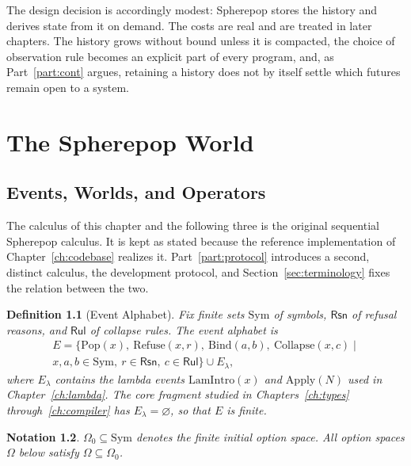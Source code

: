 \documentclass[12pt,oneside,openany]{book}
\theoremstyle{spherepop}
\newtheorem{definition}{Definition}[chapter]
\theoremstyle{remarkstyle}
\newtheorem{notation}[definition]{Notation}
\newcommand{\Pop}{\mathrm{Pop}}
\newcommand{\Rfuse}{\mathrm{Refuse}}
\newcommand{\Bind}{\mathrm{Bind}}
\newcommand{\Col}{\mathrm{Collapse}}
\newcommand{\Sym}{\mathrm{Sym}}
\begin{document}
The design decision is accordingly modest: Spherepop stores the history and derives state from it on demand. The costs are real and are treated in later chapters. The history grows without bound unless it is compacted, the choice of observation rule becomes an explicit part of every program, and, as Part~\ref{part:cont} argues, retaining a history does not by itself settle which futures remain open to a system.

\chapter{The Spherepop World}
\label{ch:world}

\section{Events, Worlds, and Operators}

The calculus of this chapter and the following three is the original sequential Spherepop calculus. It is kept as stated because the reference implementation of Chapter~\ref{ch:codebase} realizes it. Part~\ref{part:protocol} introduces a second, distinct calculus, the development protocol, and Section~\ref{sec:terminology} fixes the relation between the two.

\begin{definition}[Event Alphabet]
Fix finite sets $\Sym$ of symbols, $\mathsf{Rsn}$ of refusal reasons, and $\mathsf{Rul}$ of collapse rules. The \emph{event alphabet} is
\[
\begin{gathered}E=\{\Pop(x),\ \Rfuse(x,r),\ \Bind(a,b),\ \Col(x,c)\mid\\ x,a,b\in\Sym,\ r\in\mathsf{Rsn},\ c\in\mathsf{Rul}\}\cup E_\lambda,\end{gathered}
\]
where $E_\lambda$ contains the lambda events $\mathrm{LamIntro}(x)$ and $\mathrm{Apply}(N)$ used in Chapter~\ref{ch:lambda}. The core fragment studied in Chapters~\ref{ch:types} through~\ref{ch:compiler} has $E_\lambda=\varnothing$, so that $E$ is finite.
\end{definition}

\begin{notation}
$\Omega_0\subseteq\Sym$ denotes the finite \emph{initial option space}. All option spaces $\Omega$ below satisfy $\Omega\subseteq\Omega_0$.
\end{notation}
\end{document}

